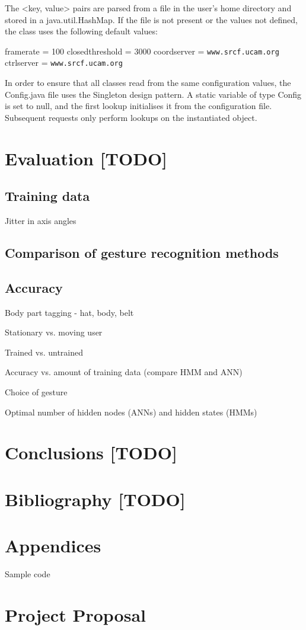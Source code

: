\documentclass[12pt,a4,notitlepage]{report}
\renewcommand{\_}{\texttt{\symbol{95}}}
\newcommand{\<}{\texttt{\symbol{60}}}
\renewcommand{\>}{\texttt{\symbol{62}}}
\begin{document}
The <key, value> pairs are parsed from a file in the user's home directory and stored in a java.util.HashMap. If the file is not present or the values not defined, the class uses the following default values:

framerate = 100
closedthreshold = 3000
coordserver = \verb^www.srcf.ucam.org^
ctrlserver = \verb^www.srcf.ucam.org^

In order to ensure that all classes read from the same configuration values, the Config.java file uses the Singleton design pattern. A static variable of type Config is set to null, and the first lookup initialises it from the configuration file. Subsequent requests only perform lookups on the instantiated object.

\chapter{Evaluation [TODO]}

\section{Training data}

Jitter in axis angles


\section{Comparison of gesture recognition methods}

\section{Accuracy}

Body part tagging - hat, body, belt

Stationary vs. moving user

Trained vs. untrained

Accuracy vs. amount of training data (compare HMM and ANN)

Choice of gesture

Optimal number of hidden nodes (ANNs) and hidden states (HMMs)


\chapter{Conclusions [TODO]}

\chapter{Bibliography [TODO]}

%

\appendix

\chapter{Appendices}

Sample code

\cleardoublepage

\chapter{Project Proposal}

%
\end{document}
